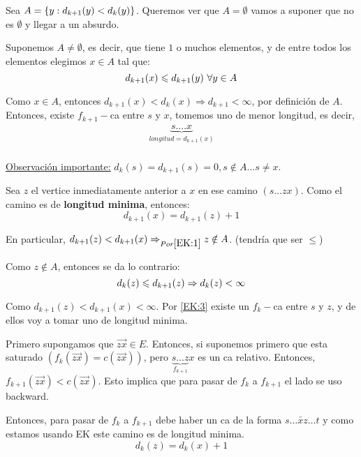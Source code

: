 \documentclass[12pt,a4paper]{article}
\begin{document}
Sea $A = \left\lbrace y: d_{k+1}(y) < d_{k}(y) \right\rbrace$. Queremos ver que $A = \emptyset$ 
vamos a suponer que no es $\emptyset$ y llegar a un absurdo.
\medskip

Suponemos $A \neq \emptyset$, es decir, que tiene $1$ o muchos elementos, y de 
entre todos los elementos elegimos $x \in A$ tal que:
\begin{equation}
    d_{k+1}(x) \leqslant d_{k+1}(y)\,\, \forall y \in A
    \label{EK:1}
\end{equation}

Como $x \in A$, entonces $d_{k+1}(x) < d_{k}(x) \Rightarrow d_{k+1} < \infty$, por 
definición de $A$.
Entonces, existe $f_{k+1}-$ca entre $s$ y $x$, tomemos uno de menor longitud, es 
decir,
\begin{align*}
    \underbrace{s .... x}_{longitud = d_{k+1}(x)}\\
\end{align*}

\underline{Observación importante:} 
$d_{k}(s) = d_{k+1}(s) = 0, s\notin A \ldots s \neq x$.
\medskip

Sea $z$ el vertice inmediatamente anterior a $x$ en ese camino $(s\ldots zx)$. 
Como el camino es de \textbf{longitud minima}, entonces:
\begin{equation}
    d_{k+1}(x) = d_{k+1}(z) + 1
    \label{EK:2}
\end{equation}

En particular, $d_{k+1}(z) < d_{k+1}(x) \Rightarrow_{Por \eqref{EK:1}} z \notin A$. 
(tendría que ser $\leq$)
\medskip

Como $z \notin A$, entonces se da lo contrario:
\begin{equation}
    d_{k}(z) \leqslant d_{k+1}(z) \Rightarrow d_{k}(z) < \infty
    \label{EK:3}
\end{equation}

Como $d_{k+1}(z) < d_{k+1}(x) < \infty$. Por \eqref{EK:3} existe un $f_{k}-$ca 
entre $s$ y $z$, y de ellos voy a tomar uno de longitud minima.
\medskip

Primero supongamos que $\overrightarrow{zx} \in E$. Entonces, si suponemos 
primero que esta saturado $(f_{k}(\overrightarrow{zx}) = c(\overrightarrow{zx}))$, 
pero $\underbrace{s\ldots z}_{f_{k+1}}x$ es un ca relativo. Entonces, 
$f_{k+1}(\overrightarrow{zx}) < c(\overrightarrow{zx})$. Esto implica que para 
pasar de $f_{k}$ a $f_{k+1}$ el lado se uso backward.
\medskip

Entonces, para pasar de $f_{k}$ a $f_{k+1}$ debe haber un ca de la forma 
$s \ldots \overleftarrow{xz} \ldots t$ y como estamos usando EK este camino es de 
longitud minima.
\begin{equation}
    d_{k}(z) = d_{k}(x) + 1
    \label{EK:4}
\end{equation}
\end{document}
